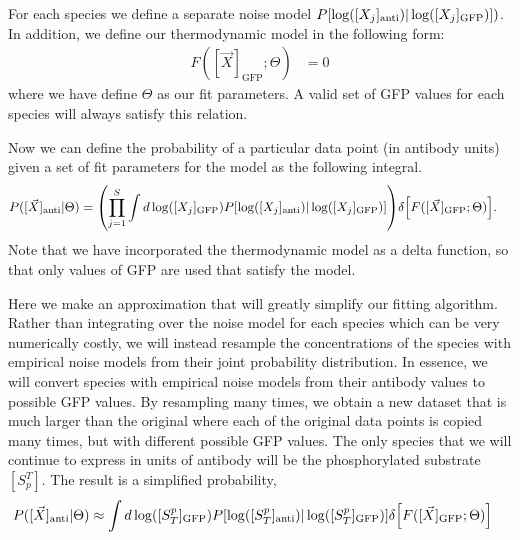 \documentclass[aps,onecolumn,superscriptaddress,notitlepage]{revtex4-1}
\begin{document}
For each species we define a separate noise model $P\qty[\log([X_j]_{\mathrm{anti}}) | \log([X_j]_{\mathrm{GFP}})])$.
In addition, we define our thermodynamic model in the following form:
\begin{align}
F([\vec{X}]_{\mathrm{GFP}};\Theta) &= 0
\end{align} 
where we have define $\Theta$ as our fit parameters.
A valid set of GFP values for each species will always satisfy this relation.


Now we can define the probability of a particular data point (in antibody units) given a set of fit parameters for the model as the following integral.
\begin{align}
P([\vec{X}]_{\mathrm{anti}} | \Theta ) &= \qty(\prod_{j=1}^S \int d\log([X_j]_{\mathrm{GFP}}) P\qty[\log([X_j]_{\mathrm{anti}}) | \log([X_j]_{\mathrm{GFP}})])\delta\qty[F([\vec{X}]_{\mathrm{GFP}};\Theta)].
\end{align}
Note that we have incorporated the thermodynamic model as a delta function, so that only values of GFP are used that satisfy the model.

Here we make an approximation that will greatly simplify our fitting algorithm. 
Rather than integrating over the noise model for each species which can be very numerically costly, we will instead resample the concentrations of the species with empirical noise models from their joint probability distribution.
In essence, we will convert species with empirical noise models from their antibody values to possible GFP values.
By resampling many times, we obtain a new dataset that is much larger than the original where each of the original data points is copied many times, but with different possible GFP values. The only species that we will continue to express in units of antibody will be the phosphorylated substrate $[S_p^T]$.
The result is a simplified probability,
\begin{align}
P([\vec{X}]_{\mathrm{anti}} | \Theta ) &\approx   \int d\log([S_T^p]_{\mathrm{GFP}}) P\qty[\log([S_T^p]_{\mathrm{anti}}) | \log([S_T^p]_{\mathrm{GFP}})]\delta\qty[F([\vec{X}]_{\mathrm{GFP}};\Theta)]
\end{align}
\end{document}
